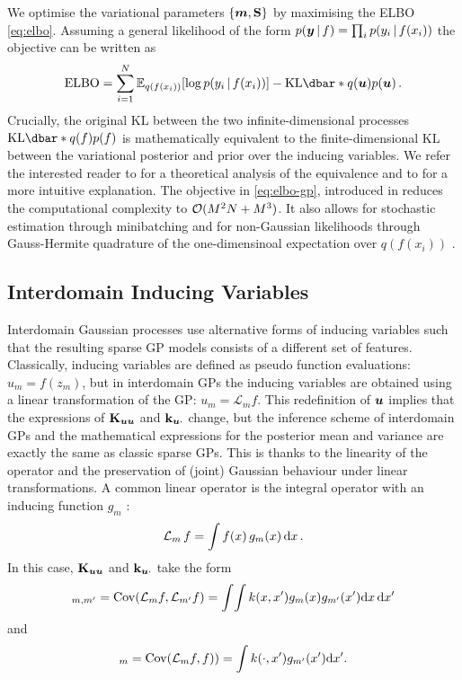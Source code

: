 We optimise the variational parameters $\{\bm{m}, \mathbf{{S}}\}$ by maximising the ELBO \cref{eq:elbo}. Assuming a general likelihood of the form $p(\bm{y} \,|\, f) = \prod_i p(y_i \,|\, f(x_i))$ the objective can be written as
\begin{equation}
  \label{eq:elbo-gp} 
  \textrm{ELBO} = \sum_{i=1}^N \Exp{q(f(x_i))}{\log p(y_i \given f(x_i))} - \KL{q(\vu)}{p(\vu)} \,. 
\end{equation}
Crucially, the original KL between the two infinite-dimensional processes $\KL{q(f)}{p(f)}$ is mathematically equivalent to the finite-dimensional KL between the variational posterior and prior over the inducing variables. We refer the interested reader to \citet{matthews16} for a theoretical analysis of the equivalence and to \citet[Section 4.1]{Leibfried2020Tutorial} for a more intuitive explanation. The objective in \cref{eq:elbo-gp}, introduced in \citet{hensman2013,hensman2015scalable} reduces the computational complexity to $\mathcal{O}(M^2 N + M^3)$. It also allows for stochastic estimation through minibatching \citep{hensman2013} and for non-Gaussian likelihoods through Gauss-Hermite quadrature of the one-dimensinoal expectation over $q(f(x_i))$ \citep{hensman2015scalable}.

\subsection{Interdomain Inducing Variables}

Interdomain Gaussian processes use alternative forms of inducing variables such that the resulting sparse GP models consists of a different set of features. %
Classically, inducing variables are defined as pseudo function evaluations: $u_m = f(z_m)$, but in interdomain GPs the inducing variables are obtained using a linear transformation of the GP: $u_m = \mathcal{L}_m f$. This redefinition of $\bm{u}$ implies that the expressions of $\mathbf{{K}}_{\bm{u} \bm{u}}$ and $\mathbf{k}_{\bm{u} \cdot}$ change, but the inference scheme of interdomain GPs and the mathematical expressions for the posterior mean and variance are exactly the same as classic sparse GPs. This is thanks to the linearity of the operator and the preservation of (joint) Gaussian behaviour under linear transformations. A common linear operator is the integral operator with an inducing function $g_m$ \citep{lazaro2009inter}:
\begin{equation*}
    \mathcal{L}_m\,f = \int f(x)\,g_m(x)\,\mathrm{d}{x}\,.
\end{equation*}
In this case, $\mathbf{{K}}_{\bm{u} \bm{u}}$ and $\mathbf{k}_{\bm{u} \cdot}$ take the form
\begin{equation}
 [\Kuu]_{m,m'}  = \Cov(\mathcal{L}_m f, \mathcal{L}_{m'} f) = \int\!\int k(x, x') g_{m}(x) g_{m'}(x') \calcd{x}\,\calcd{x'}
\end{equation}
and 
\begin{equation}
 [\kux]_{m}  = \Cov(\mathcal{L}_m f, f)) = \int k(\cdot, x') g_{m'}(x') \calcd{x'}.
\end{equation}

